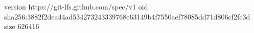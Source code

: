 version https://git-lfs.github.com/spec/v1
oid sha256:3882f2dea44ad534273243339768e63149b4f7550aef78085dd71d806cf2fc3d
size 626416

